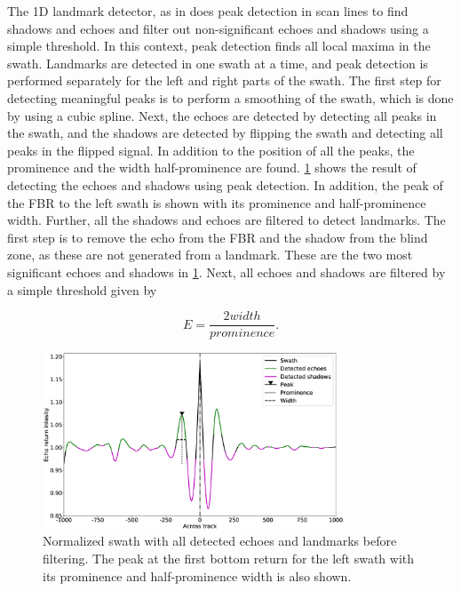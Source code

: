 The 1D landmark detector, as in \cite{Al-Rawi2017LandmarkImages,} does peak detection in scan lines to find shadows and echoes and filter out non-significant echoes and shadows using a simple threshold. In this context, peak detection finds all local maxima in the swath. Landmarks are detected in one swath at a time, and peak detection is performed separately for the left and right parts of the swath. The first step for detecting meaningful peaks is to perform a smoothing of the swath, which is done by using a cubic spline. Next, the echoes are detected by detecting all peaks in the swath, and the shadows are detected by flipping the swath and detecting all peaks in the flipped signal. In addition to the position of all the peaks, the prominence and the width half-prominence are found. \cref{fig:1D_swath_w_landmarks} shows the result of detecting the echoes and shadows using peak detection. In addition, the peak of the FBR to the left swath is shown with its prominence and half-prominence width.
Further, all the shadows and echoes are filtered to detect landmarks. The first step is to remove the echo from the FBR and the shadow from the blind zone, as these are not generated from a landmark. These are the two most significant echoes and shadows in \cref{fig:1D_swath_w_landmarks}. Next, all echoes and shadows are filtered by a simple threshold given by

\begin{equation}
    E = \frac{2 width}{prominence}.
    \label{eq:1D_thres}
\end{equation}

\begin{figure}
    \centering
    \includegraphics[width=0.8\textwidth]{figures/1D_swath_w_landmarks.eps}
    \caption{Normalized swath with all detected echoes and landmarks before filtering. The peak at the first bottom return for the left swath with its prominence and half-prominence width is also shown.}
    \label{fig:1D_swath_w_landmarks}
\end{figure}


